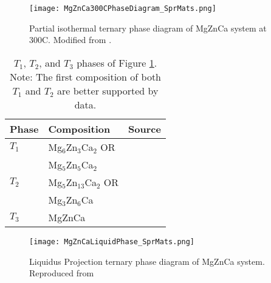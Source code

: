 \documentclass[a4paper,12pt,oneside]{report}%
\begin{document}
\begin{figure}[htbp]
	\centering
	\texttt{[image: MgZnCa300CPhaseDiagram\_SprMats.png]}
	\caption{Partial isothermal ternary phase diagram of MgZnCa system at 300\degree C. Modified from \cite{Melnik1978}.}
	\label{fig:MgZnCa300PhaseD}
\end{figure}

\begin{table}[h]
	\centering
	\begin{tabular}{ l l l }
		\toprule
		Phase & Composition & Source \\
		\midrule
		$T_{1}$ & Mg$_{6}$Zn$_{3}$Ca$_{2}$ OR & \cite{Clark1961} \\
		& Mg$_{5}$Zn$_{5}$Ca$_{2}$ & \\
		$T_{2}$	& Mg$_{5}$Zn$_{13}$Ca$_{2}$ OR & \cite{Clark1961} \\
		& Mg$_{3}$Zn$_{6}$Ca & \\
		$T_{3}$	& MgZnCa & \cite{Schulze1961} \\
		\bottomrule
	\end{tabular}
	\caption{$T_{1}$, $T_{2}$, and $T_{3}$ phases of Figure \ref{fig:MgZnCa300PhaseD}. Note: The first composition of both $T_{1}$ and $T_{2}$ are better supported by data.}
	\label{tab:SputterParameters}
\end{table}

\begin{figure}[htbp]
	\centering
	\texttt{[image: MgZnCaLiquidPhase\_SprMats.png]}
	\caption{Liquidus Projection ternary phase diagram of MgZnCa system. Reproduced from \cite{Paris1933}}
	\label{fig:MgZnCaLiquidPhaseD}
\end{figure}
\end{document}
